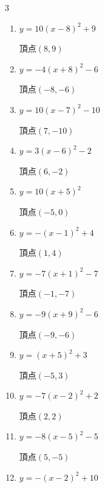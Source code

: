 \begin{multicols}{3}
\begin{enumerate}
        $\displaystyle 頂点\left( 9 , -2 \right)$

  \item $\displaystyle y=10\left( x-8\right)^{2}+9$

        $\displaystyle 頂点\left( 8 , 9 \right)$

  \item $\displaystyle y=-4\left( x+8\right)^{2}-6$

        $\displaystyle 頂点\left( -8 , -6 \right)$

  \item $\displaystyle y=10\left( x-7\right)^{2}-10$

        $\displaystyle 頂点\left( 7 , -10 \right)$

  \item $\displaystyle y=3\left( x-6\right)^{2}-2$

        $\displaystyle 頂点\left( 6 , -2 \right)$

  \item $\displaystyle y=10\left( x+5\right)^{2}$

        $\displaystyle 頂点\left( -5 , 0 \right)$

  \item $\displaystyle y=-\left( x-1\right)^{2}+4$

        $\displaystyle 頂点\left( 1 , 4 \right)$

  \item $\displaystyle y=-7\left( x+1\right)^{2}-7$

        $\displaystyle 頂点\left( -1 , -7 \right)$

  \item $\displaystyle y=-9\left( x+9\right)^{2}-6$

        $\displaystyle 頂点\left( -9 , -6 \right)$

  \item $\displaystyle y=\left( x+5\right)^{2}+3$

        $\displaystyle 頂点\left( -5 , 3 \right)$

  \item $\displaystyle y=-7\left( x-2\right)^{2}+2$

        $\displaystyle 頂点\left( 2 , 2 \right)$

  \item $\displaystyle y=-8\left( x-5\right)^{2}-5$

        $\displaystyle 頂点\left( 5 , -5 \right)$

  \item $\displaystyle y=-\left( x-2\right)^{2}+10$


\end{enumerate}
\end{multicols}

